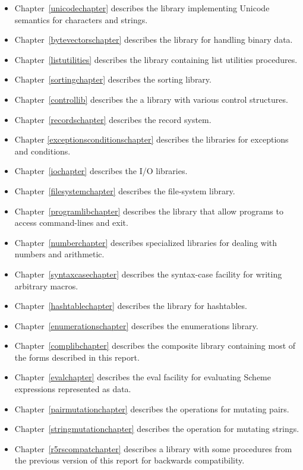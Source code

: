 \documentclass[twoside,twocolumn]{algol60}
\begin{document}
{\begin{itemize}
\item 
Chapter~\ref{unicodechapter} describes the library implementing Unicode
semantics for characters and strings.
\item Chapter~\ref{bytevectorschapter}
describes the library for handling binary data.
\item 
Chapter~\ref{listutilities} describes the library containing list utilities
procedures.
\item Chapter~\ref{sortingchapter} describes the sorting
library.
\item
Chapter~\ref{controllib} describes the a library with various
control structures.
\item Chapter~\ref{recordschapter} describes the record system.
\item Chapter \ref{exceptionsconditionschapter} describes the libraries for
exceptions and conditions.
\item Chapter~\ref{iochapter} describes the I/O
libraries.
\item Chapter~\ref{filesystemchapter} describes the file-system
  library.
\item Chapter~\ref{programlibchapter} describes the library that allow
  programs to access command-lines and exit.
\item 
Chapter~\ref{numberchapter} describes specialized libraries
for dealing with numbers and arithmetic.
\item 
Chapter~\ref{syntaxcasechapter} describes the {\cf syntax-case}
facility for writing arbitrary macros.
\item Chapter~\ref{hashtablechapter}
describes the library for hashtables.
\item 
Chapter~\ref{enumerationschapter} describes the enumerations library.
\item Chapter~\ref{complibchapter} describes the composite library
containing most of the forms described in this report.
\item 
Chapter~\ref{evalchapter} describes the {\cf eval} facility for
evaluating Scheme expressions represented as data.
\item 
Chapter~\ref{pairmutationchapter} describes the operations for
mutating pairs.
\item 
Chapter~\ref{stringmutationchapter} describes the operation for
mutating strings.
\item Chapter~\ref{r5rscompatchapter} describes a library
with some procedures from the previous
version of this report for backwards compatibility.
\end{itemize}

}
\end{document}
